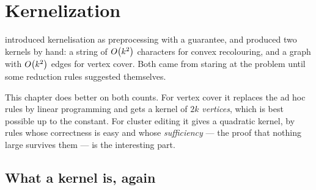 
\chapter{Kernelization}
\label{ch:kernelization}

 introduced kernelisation as preprocessing with a guarantee, and
produced two kernels by hand: a string of $O\!\left(k^2\right)$ characters for convex
recolouring, and a graph with $O\!\left(k^2\right)$ edges for vertex cover. Both came
from staring at the problem until some reduction rules suggested themselves.

This chapter does better on both counts. For vertex cover it replaces the ad hoc
rules by linear programming and gets a kernel of $2k$ \emph{vertices}, which is
best possible up to the constant. For cluster editing it gives a quadratic
kernel, by rules whose correctness is easy and whose \emph{sufficiency} --- the
proof that nothing large survives them --- is the interesting part.

\begin{goals}
\end{goals}

\section{What a kernel is, again}
\label{sec:kernel-recap}

